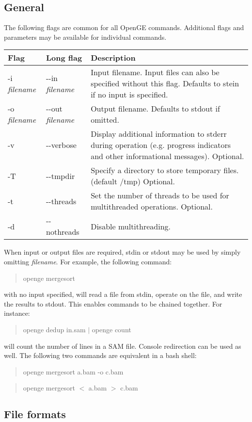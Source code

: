 \documentclass[11pt]{article}
\newcommand {\cmd}[1] {\begin{quote}#1\end{quote}}
\begin{document}
\subsection {General}
The following flags are common for all OpenGE commands. Additional flags and parameters may be available for individual commands.
\begin{center}
\begin{tabular}{llp{3.5in}}
\hline
Flag&Long flag&Description\\ \hline
-i \textit{filename}&{-}{-}in \textit{filename}&Input filename. Input files can also be specified without this flag. Defaults to stein if no input is specified.\\
-o \textit{filename}&{-}{-}out \textit{filename}&Output filename. Defaults to stdout if omitted. \\
-v&{-}{-}verbose&Display additional information to stderr during operation (e.g. progress indicators and other informational messages). Optional.\\
-T&{-}{-}tmpdir&Specify a directory to store temporary files. (default /tmp) Optional.\\
-t&{-}{-}threads&Set the number of threads to be used for multithreaded operations. Optional.\\
-d&{-}{-}nothreads&Disable multithreading.\\
\end{tabular}
\end{center}

When input or output files are required, stdin or stdout may be used by simply omitting \textit{filename}. For example, the following command:

\cmd{openge mergesort}

with no input specified, will read a file from stdin, operate on the file, and write the results to stdout. This enables commands to be chained together. For instance:

\cmd{openge dedup in.sam $|$ openge count}

will count the number of lines in a SAM file. Console redirection can be used as well. The following two commands are equivalent in a bash shell:

\cmd{openge mergesort a.bam -o c.bam}
\cmd{openge mergesort $<$ a.bam $>$ c.bam}

\subsection {File formats}
\end{document}
